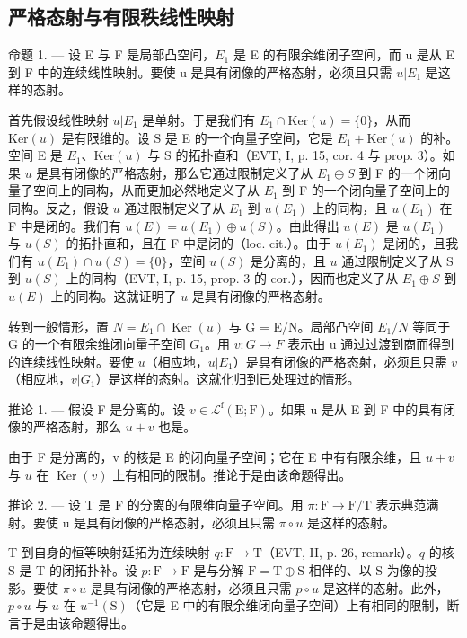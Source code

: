 \subsection{严格态射与有限秩线性映射}

命题 1. --- 设 E 与 F 是局部凸空间，\(E_{1}\) 是 E 的有限余维闭子空间，而 u 是从 E 到 F 中的连续线性映射。要使 u 是具有闭像的严格态射，必须且只需 \(u|E_{1}\) 是这样的态射。

首先假设线性映射 \(u|E_1\) 是单射。于是我们有 \(E_1 \cap \text{Ker}(u) = \{0\}\)，从而 \(\text{Ker}(u)\) 是有限维的。设 S 是 E 的一个向量子空间，它是 \(E_1 + \text{Ker}(u)\) 的补。空间 E 是 \(E_1\)、\(\text{Ker}(u)\) 与 S 的拓扑直和（EVT, I, p. 15, cor. 4 与 prop. 3）。如果 \(u\) 是具有闭像的严格态射，那么它通过限制定义了从 \(E_1 \oplus S\) 到 F 的一个闭向量子空间上的同构，从而更加必然地定义了从 \(E_1\) 到 F 的一个闭向量子空间上的同构。反之，假设 \(u\) 通过限制定义了从 \(E_1\) 到 \(u(E_1)\) 上的同构，且 \(u(E_1)\) 在 F 中是闭的。我们有 \(u(E) = u(E_1) \oplus u(S)\)。由此得出 \(u(E)\) 是 \(u(E_1)\) 与 \(u(S)\) 的拓扑直和，且在 F 中是闭的（loc. cit.）。由于 \(u(E_1)\) 是闭的，且我们有 \(u(E_1) \cap u(S) = \{0\}\)，空间 \(u(S)\) 是分离的，且 \(u\) 通过限制定义了从 S 到 \(u(S)\) 上的同构（EVT, I, p. 15, prop. 3 的 cor.），因而也定义了从 \(E_1 \oplus S\) 到 \(u(E)\) 上的同构。这就证明了 \(u\) 是具有闭像的严格态射。

转到一般情形，置 \(N = E_{1} \cap \operatorname{Ker}(u)\) 与 G = E/N。局部凸空间 \(E_{1}/N\) 等同于 G 的一个有限余维闭向量子空间 \(G_{1}\)。用 \(v\colon G \to F\) 表示由 u 通过过渡到商而得到的连续线性映射。要使 \(u\)（相应地，\(u|E_{1}\)）是具有闭像的严格态射，必须且只需 \(v\)（相应地，\(v|G_{1}\)）是这样的态射。这就化归到已处理过的情形。

推论 1. --- 假设 F 是分离的。设 \(v \in \mathcal{L}^{\mathrm{f}}(\mathrm{E};\mathrm{F})\)。如果 u 是从 E 到 F 中的具有闭像的严格态射，那么 \(u + v\) 也是。

由于 F 是分离的，v 的核是 E 的闭向量子空间；它在 E 中有有限余维，且 \(u + v\) 与 \(u\) 在 \(\operatorname{Ker}(v)\) 上有相同的限制。推论于是由该命题得出。

推论 2. --- 设 T 是 F 的分离的有限维向量子空间。用 \(\pi\colon\mathrm{F}\to\mathrm{F}/\mathrm{T}\) 表示典范满射。要使 u 是具有闭像的严格态射，必须且只需 \(\pi\circ u\) 是这样的态射。

T 到自身的恒等映射延拓为连续映射 \(q \colon \mathrm{F} \to \mathrm{T}\)（EVT, II, p. 26, remark）。\(q\) 的核 S 是 T 的闭拓扑补。设 \(p \colon \mathrm{F} \to \mathrm{F}\) 是与分解 \(\mathrm{F} = \mathrm{T} \oplus \mathrm{S}\) 相伴的、以 S 为像的投影。要使 \(\pi \circ u\) 是具有闭像的严格态射，必须且只需 \(p \circ u\) 是这样的态射。此外，\(p \circ u\) 与 \(u\) 在 \(u^{-1}(\mathrm{S})\)（它是 E 中的有限余维闭向量子空间）上有相同的限制，断言于是由该命题得出。

